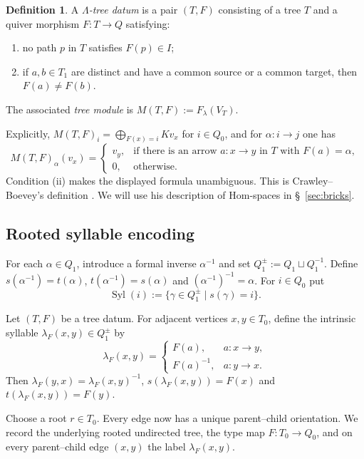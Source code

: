 \documentclass[11pt,a4paper]{amsart}
\newcommand{\Syl}{\operatorname{Syl}}
\theoremstyle{definition}
\newtheorem{definition}{Definition}[section]
\theoremstyle{plain}
\theoremstyle{remark}
\numberwithin{equation}{section}
\begin{document}
\begin{definition}\label{def:tree-datum}
A \emph{$\Lambda$-tree datum} is a pair $(T,F)$ consisting of a tree $T$ and a quiver morphism $F:T\to Q$ satisfying:
\begin{enumerate}[label=\textup{(\roman*)}]
\item no path $p$ in $T$ satisfies $F(p)\in I$;
\item if $a,b\in T_1$ are distinct and have a common source or a common target, then $F(a)\neq F(b)$.
\end{enumerate}
The associated \emph{tree module} is $M(T,F):=F_\lambda(V_T)$.
\end{definition}

Explicitly, $M(T,F)_i=\bigoplus_{F(x)=i}Kv_x$ for $i\in Q_0$, and for $\alpha:i\to j$ one has
\[
M(T,F)_\alpha(v_x)=\begin{cases}v_y,&\text{if there is an arrow }a:x\to y\text{ in }T\text{ with }F(a)=\alpha,\\0,&\text{otherwise.}\end{cases}
\]
Condition (ii) makes the displayed formula unambiguous. This is Crawley--Boevey's definition \cite[\S 1]{CB89}. We will use his description of Hom-spaces in \S~\ref{sec:bricks}.

\subsection{Rooted syllable encoding}

For each $\alpha\in Q_1$, introduce a formal inverse $\alpha^{-1}$ and set $Q_1^{\pm}:=Q_1\sqcup Q_1^{-1}$. Define $s(\alpha^{-1})=t(\alpha)$, $t(\alpha^{-1})=s(\alpha)$ and $(\alpha^{-1})^{-1}=\alpha$. For $i\in Q_0$ put
\[
\Syl(i):=\{\gamma\in Q_1^{\pm}\mid s(\gamma)=i\}.
\]

Let $(T,F)$ be a tree datum. For adjacent vertices $x,y\in T_0$, define the intrinsic syllable $\lambda_F(x,y)\in Q_1^{\pm}$ by
\[
\lambda_F(x,y)=\begin{cases}F(a),&a:x\to y,\\F(a)^{-1},&a:y\to x.\end{cases}
\]
Then $\lambda_F(y,x)=\lambda_F(x,y)^{-1}$, $s(\lambda_F(x,y))=F(x)$ and $t(\lambda_F(x,y))=F(y)$.

Choose a root $r\in T_0$. Every edge now has a unique parent--child orientation. We record the underlying rooted undirected tree, the type map $F:T_0\to Q_0$, and on every parent--child edge $(x,y)$ the label $\lambda_F(x,y)$.
\end{document}

